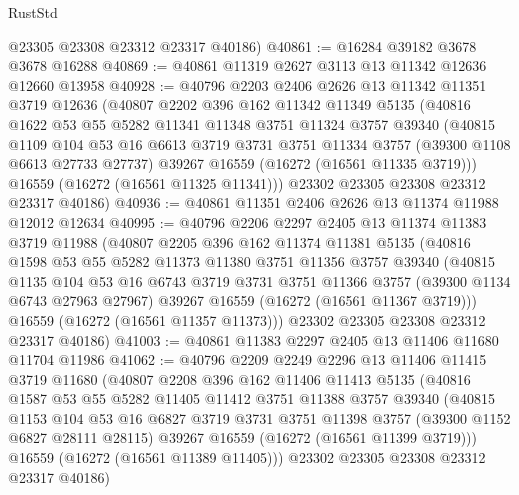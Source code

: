 \begin{lexlean}{RustStd}
\begin{coremodule}
      @23305
      @23308
      @23312
      @23317
      @40186)
@40861 := @16284 @39182 @3678 @3678 @16288
@40869 := @40861 @11319 @2627 @3113 @13 @11342 @12636 @12660 @13958
@40928 := @40796
    @2203
    @2406
    @2626
    @13
    @11342
    @11351
    @3719
    @12636
    (@40807
      @2202
      @396
      @162
      @11342
      @11349
      @5135
      (@40816
        @1622
        @53
        @55
        @5282
        @11341
        @11348
        @3751
        @11324
        @3757
        @39340
        (@40815
          @1109
          @104
          @53
          @16
          @6613
          @3719
          @3731
          @3751
          @11334
          @3757
          (@39300 @1108 @6613 @27733 @27737)
          @39267
          @16559
          (@16272 (@16561 @11335 @3719)))
        @16559
        (@16272 (@16561 @11325 @11341)))
      @23302
      @23305
      @23308
      @23312
      @23317
      @40186)
@40936 := @40861 @11351 @2406 @2626 @13 @11374 @11988 @12012 @12634
@40995 := @40796
    @2206
    @2297
    @2405
    @13
    @11374
    @11383
    @3719
    @11988
    (@40807
      @2205
      @396
      @162
      @11374
      @11381
      @5135
      (@40816
        @1598
        @53
        @55
        @5282
        @11373
        @11380
        @3751
        @11356
        @3757
        @39340
        (@40815
          @1135
          @104
          @53
          @16
          @6743
          @3719
          @3731
          @3751
          @11366
          @3757
          (@39300 @1134 @6743 @27963 @27967)
          @39267
          @16559
          (@16272 (@16561 @11367 @3719)))
        @16559
        (@16272 (@16561 @11357 @11373)))
      @23302
      @23305
      @23308
      @23312
      @23317
      @40186)
@41003 := @40861 @11383 @2297 @2405 @13 @11406 @11680 @11704 @11986
@41062 := @40796
    @2209
    @2249
    @2296
    @13
    @11406
    @11415
    @3719
    @11680
    (@40807
      @2208
      @396
      @162
      @11406
      @11413
      @5135
      (@40816
        @1587
        @53
        @55
        @5282
        @11405
        @11412
        @3751
        @11388
        @3757
        @39340
        (@40815
          @1153
          @104
          @53
          @16
          @6827
          @3719
          @3731
          @3751
          @11398
          @3757
          (@39300 @1152 @6827 @28111 @28115)
          @39267
          @16559
          (@16272 (@16561 @11399 @3719)))
        @16559
        (@16272 (@16561 @11389 @11405)))
      @23302
      @23305
      @23308
      @23312
      @23317
      @40186)

\end{coremodule}
\end{lexlean}
